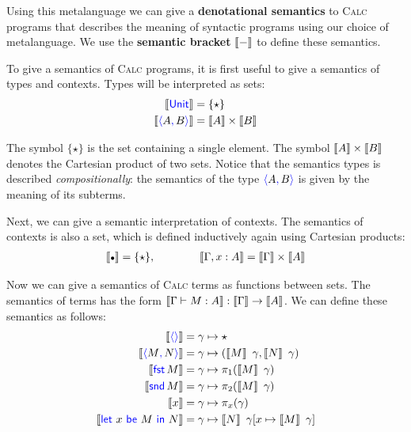 Using this metalanguage we can give a \textbf{denotational semantics} to
\textsc{Calc} programs that describes the meaning of syntactic programs using 
our choice of metalanguage.
We use the \textbf{semantic bracket} $\left\llbracket - \right\rrbracket$ to define these semantics.

To give a semantics of \textsc{Calc} programs, it is first useful to give a
semantics of types and contexts.  Types will be interpreted as sets:
\begin{align} \label{eqn:calc-types-in-finset}
  \dbracket{\plUnit} &= \{\star\} \\
  \dbracket{\plpair{A}{B}} &= \dbracket{A} \times \dbracket{B}
\end{align}

The symbol $\{\star\}$ is the set containing a single element. The symbol
$\left\llbracket A \right\rrbracket \times \left\llbracket B \right\rrbracket$ denotes the Cartesian product of two sets.
Notice that the semantics types is described \emph{compositionally}: the 
semantics of the type $\plpair{A}{B}$ is given by the meaning of its subterms.

Next, we can give a semantic interpretation of contexts. The semantics of 
contexts is also a set, which is defined inductively 
again using Cartesian products:
\begin{align*}
  \dbracket{\ctxemp} = \{\star\},
  \qquad\qquad
  \dbracket{\Gamma, x : A} =  \dbracket{\Gamma} \times \dbracket{A}
\end{align*}

Now we can give a semantics of \textsc{Calc} terms as functions between sets. 
The semantics of terms has the form $\left\llbracket \Gamma \vdash M : A \right\rrbracket
: \left\llbracket \Gamma \right\rrbracket \to \left\llbracket A \right\rrbracket$.
We can define these semantics as follows:
\begin{align*}
  \dbracket{\plunit{}} &= \gamma \mapsto \star\\
  \dbracket{\plpair{M}{N}} &= \gamma \mapsto (\dbracket{M}~\gamma, \dbracket{N}~\gamma) \\
  \dbracket{\plfst{M}} &= \gamma \mapsto \pi_1 (\dbracket{M}~\gamma) \\
  \dbracket{\plsnd{M}} &= \gamma \mapsto \pi_2 (\dbracket{M}~\gamma) \\
  \dbracket{x} &= \gamma \mapsto \pi_x (\gamma) \\
  \dbracket{\pllet{x}{M}{N}} &= \gamma \mapsto \dbracket{N}~\gamma[x \mapsto \dbracket{M}~\gamma]
\end{align*}


